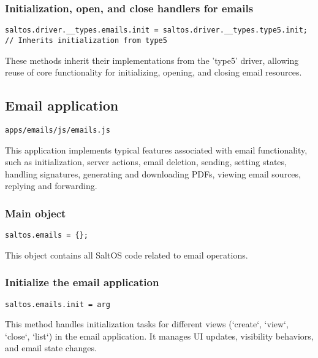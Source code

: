 \documentclass[a4paper]{article}
\begin{document}
\hypertarget{toc66}{}
\subsubsection{Initialization, open, and close handlers for emails}

\begin{lstlisting}
saltos.driver.__types.emails.init = saltos.driver.__types.type5.init; // Inherits initialization from type5
\end{lstlisting}

These methods inherit their implementations from the 'type5' driver, allowing
reuse of core functionality for initializing, opening, and closing email resources.

\hypertarget{toc67}{}
\subsection{Email application}

\begin{lstlisting}
apps/emails/js/emails.js
\end{lstlisting}

This application implements typical features associated with email functionality,
such as initialization, server actions, email deletion, sending, setting states,
handling signatures, generating and downloading PDFs, viewing email sources, replying
and forwarding.

\hypertarget{toc68}{}
\subsubsection{Main object}

\begin{lstlisting}
saltos.emails = {};
\end{lstlisting}

This object contains all SaltOS code related to email operations.

\hypertarget{toc69}{}
\subsubsection{Initialize the email application}

\begin{lstlisting}
saltos.emails.init = arg
\end{lstlisting}

This method handles initialization tasks for different views (`create`, `view`, `close`, `list`)
in the email application. It manages UI updates, visibility behaviors, and email state changes.
\end{document}
